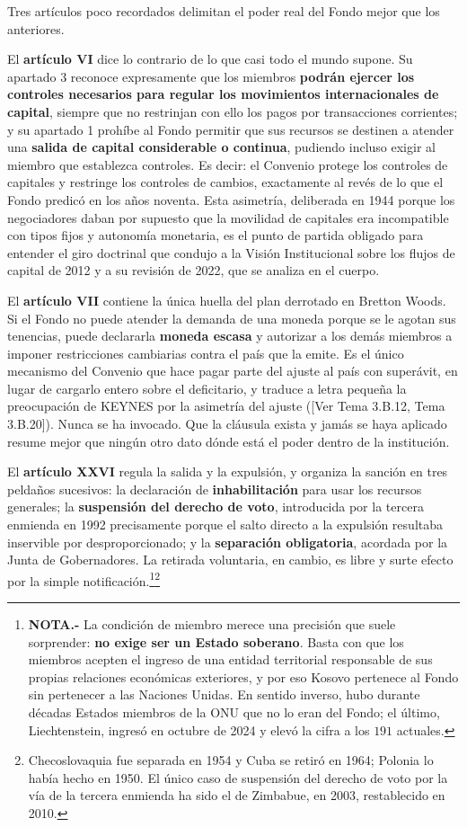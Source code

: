 \documentclass[10pt,a4paper]{article}
\newcommand{\authorfont}[1]{{\fontfamily{EBGaramond-TLF}\selectfont #1}}
\begin{document}
Tres artículos poco recordados delimitan el poder real del Fondo mejor que los anteriores.

El \textbf{artículo VI} dice lo contrario de lo que casi todo el mundo supone. Su apartado 3 reconoce expresamente que los miembros \textbf{podrán ejercer los controles necesarios para regular los movimientos internacionales de capital}, siempre que no restrinjan con ello los pagos por transacciones corrientes; y su apartado 1 prohíbe al Fondo permitir que sus recursos se destinen a atender una \textbf{salida de capital considerable o continua}, pudiendo incluso exigir al miembro que establezca controles. Es decir: el Convenio protege los controles de capitales y restringe los controles de cambios, exactamente al revés de lo que el Fondo predicó en los años noventa. Esta asimetría, deliberada en 1944 porque los negociadores daban por supuesto que la movilidad de capitales era incompatible con tipos fijos y autonomía monetaria, es el punto de partida obligado para entender el giro doctrinal que condujo a la Visión Institucional sobre los flujos de capital de 2012 y a su revisión de 2022, que se analiza en el cuerpo.

El \textbf{artículo VII} contiene la única huella del plan derrotado en Bretton Woods. Si el Fondo no puede atender la demanda de una moneda porque se le agotan sus tenencias, puede declararla \textbf{moneda escasa} y autorizar a los demás miembros a imponer restricciones cambiarias contra el país que la emite. Es el único mecanismo del Convenio que hace pagar parte del ajuste al país con superávit, en lugar de cargarlo entero sobre el deficitario, y traduce a letra pequeña la preocupación de KEYNES por la asimetría del ajuste ([\authorfont{Ver Tema 3.B.12, Tema 3.B.20}]). Nunca se ha invocado. Que la cláusula exista y jamás se haya aplicado resume mejor que ningún otro dato dónde está el poder dentro de la institución.

El \textbf{artículo XXVI} regula la salida y la expulsión, y organiza la sanción en tres peldaños sucesivos: la declaración de \textbf{inhabilitación} para usar los recursos generales; la \textbf{suspensión del derecho de voto}, introducida por la tercera enmienda en 1992 precisamente porque el salto directo a la expulsión resultaba inservible por desproporcionado; y la \textbf{separación obligatoria}, acordada por la Junta de Gobernadores. La retirada voluntaria, en cambio, es libre y surte efecto por la simple notificación.\footnote{%
    \textbf{NOTA.-} La condición de miembro merece una precisión que suele sorprender: \textbf{no exige ser un Estado soberano}. Basta con que los miembros acepten el ingreso de una entidad territorial responsable de sus propias relaciones económicas exteriores, y por eso Kosovo pertenece al Fondo sin pertenecer a las Naciones Unidas. En sentido inverso, hubo durante décadas Estados miembros de la ONU que no lo eran del Fondo; el último, Liechtenstein, ingresó en octubre de 2024 y elevó la cifra a los $191$ actuales.
}\footnote{%
    Checoslovaquia fue separada en 1954 y Cuba se retiró en 1964; Polonia lo había hecho en 1950. El único caso de suspensión del derecho de voto por la vía de la tercera enmienda ha sido el de Zimbabue, en 2003, restablecido en 2010.
}
\end{document}
